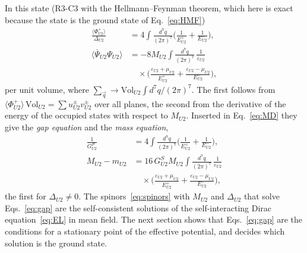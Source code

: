 In this state (R3-C3 with the Hellmann--Feynman theorem, which here is exact because the state is
the ground state of Eq.~\eqref{eq:HMF})
\begin{equation}
\begin{aligned}
\frac{\langle\Phi^+_{U2}\rangle}{\Delta_{U2}}&=4\int\frac{d^7q}{(2\pi)^7}\Big(\frac1{E^+_{U2}}+\frac1{E^-_{U2}}\Big),\\
\langle\bar\Psi_{U2}\Psi_{U2}\rangle&=-8M_{U2}\int\frac{d^7q}{(2\pi)^7}\,\frac{1}{\varepsilon_{U2}}\\
&\quad\times\Big(\frac{\varepsilon_{U2}+\mu_{U2}}{E^+_{U2}}+\frac{\varepsilon_{U2}-\mu_{U2}}{E^-_{U2}}\Big),
\end{aligned}
\label{eq:expect}
\end{equation}
per unit volume, where $\sum_{\vec q}\to\mathrm{Vol}_{U2}\int d^7q/(2\pi)^7$. The first follows
from $\langle\Phi^+_{U2}\rangle\,\mathrm{Vol}_{U2}=\sum u^\pm_{U2}v^\pm_{U2}$ over all planes, the second
from the derivative of the energy of the occupied states with respect to $M_{U2}$. Inserted in
Eq.~\eqref{eq:MD} they give the \emph{gap equation} and the \emph{mass equation},
\begin{equation}
\begin{aligned}
\frac1{G^P_{U2}}&=4\int\frac{d^7q}{(2\pi)^7}\Big(\frac1{E^+_{U2}}+\frac1{E^-_{U2}}\Big),\\
M_{U2}-m_{U2}&=16\,G^S_{U2}M_{U2}\int\frac{d^7q}{(2\pi)^7}\,\frac1{\varepsilon_{U2}}\\
&\quad\times\Big(\frac{\varepsilon_{U2}+\mu_{U2}}{E^+_{U2}}+\frac{\varepsilon_{U2}-\mu_{U2}}{E^-_{U2}}\Big),
\end{aligned}
\label{eq:gap}
\end{equation}
the first for $\Delta_{U2}\neq0$. The spinors~\eqref{eq:spinors} with $M_{U2}$ and $\Delta_{U2}$
that solve Eqs.~\eqref{eq:gap} are the self-consistent solutions of the self-interacting Dirac
equation~\eqref{eq:EL} in mean field. The next section shows that Eqs.~\eqref{eq:gap} are the
conditions for a stationary point of the effective potential, and decides which solution is the
ground state.
